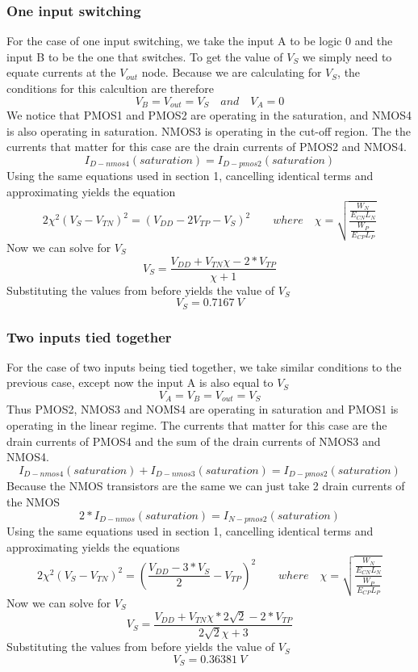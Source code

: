\documentclass[12pt]{article}
\begin{document}
\subsubsection{One input switching}
For the case of one input switching, we take the input A to be logic 0 and the input B to be the one that switches. To get the value of $V_S$
we simply need to equate currents at the $V_{out}$ node. Because we are calculating for $V_S$, the conditions for this calcultion are therefore
\[V_{B} = V_{out} = V_S \quad and \quad  V_A = 0\]
We notice that PMOS1 and PMOS2 are operating in the saturation, and NMOS4 is also operating in saturation. NMOS3 is operating in the cut-off region.
The the currents that matter for this case are the drain currents of PMOS2 and NMOS4.
\[I_{D-nmos4}(saturation) = I_{D-pmos2}(saturation) \]
Using the same equations used in section 1, cancelling identical terms and approximating yields the equation
\[2\chi^2(V_S - V_{TN})^2 = (V_{DD} - 2V_{TP} - V_S)^2 \quad\quad where \quad \chi = \sqrt{\frac{\frac{ W_N }{E_{CN}L_N  }}{\frac{ W_P }{E_{CP}L_P  }}} \]
Now we can solve for $V_S$
\[V_S = \frac{ V_{DD} + V_{TN}\chi - 2*V_{TP}  }{\chi + 1} \]
Substituting the values from before yields the value of $V_S$
\[V_S = \SI{0.7167}{V} \]
\subsubsection{Two inputs tied together}
For the case of two inputs being tied together, we take similar conditions to the previous case, except now the input A is also equal to $V_S$
\[V_A = V_{B} = V_{out} = V_S\]
Thus PMOS2, NMOS3 and NOMS4 are operating in saturation and PMOS1 is operating in the linear regime. The currents that matter for this case are the 
drain currents of PMOS4 and the sum of the drain currents of NMOS3 and NMOS4.
\[I_{D-nmos4}(saturation)+I_{D-nmos3}(saturation)= I_{D-pmos2}(saturation) \]
Because the NMOS transistors are the same we can just take 2 drain currents of the NMOS
\[2*I_{D-nmos}(saturation)= I_{N-pmos2}(saturation) \]
Using the same equations used in section 1, cancelling identical terms and approximating yields the equations
\[2\chi^2(V_S - V_{TN})^2 = (\frac{V_{DD} - 3*V_S}{2} - V_{TP})^2 \quad\quad where \quad \chi = \sqrt{\frac{\frac{ W_N }{E_{CN}L_N  }}{\frac{ W_P }{E_{CP}L_P  }}} \]
Now we can solve for $V_S$
\[V_S = \frac{ V_{DD} + V_{TN}\chi*2\sqrt{2} - 2*V_{TP}}{2\sqrt{2}\chi + 3} \]
Substituting the values from before yields the value of $V_S$
\[V_S = \SI{0.36381}{V} \]
\end{document}
